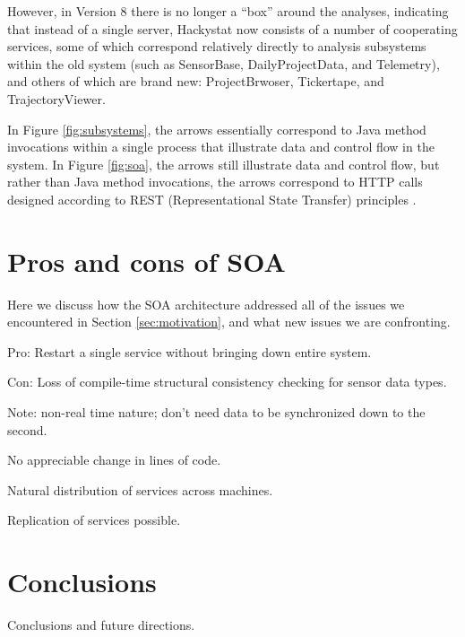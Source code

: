 \documentclass[conference,compsoc,peerreview]{IEEEtran}
\begin{document}
However, in Version 8 there is no longer a ``box'' around the analyses,
indicating that instead of a single server, Hackystat now consists of a
number of cooperating services, some of which correspond relatively
directly to analysis subsystems within the old system (such as SensorBase,
DailyProjectData, and Telemetry), and others of which are brand new:
ProjectBrwoser, Tickertape, and TrajectoryViewer.

In Figure \ref{fig:subsystems}, the arrows essentially correspond to Java
method invocations within a single process that illustrate data and control
flow in the system.  In Figure \ref{fig:soa}, the arrows still illustrate
data and control flow, but rather than Java method invocations, the arrows
correspond to HTTP calls designed according to REST (Representational State
Transfer) principles \cite{Fielding02}. 



\section{Pros and cons of SOA}
\label{sec:discussion}

Here we discuss how the SOA architecture addressed all of the issues we encountered in Section \ref{sec:motivation}, and what new issues we are confronting. 

Pro: Restart a single service without bringing down entire system.

Con: Loss of compile-time structural consistency checking for sensor data types.

Note: non-real time nature; don't need data to be synchronized down to the second. 

No appreciable change in lines of code. 

Natural distribution of services across machines. 

Replication of services possible.

\section{Conclusions}
\label{sec:conclusion}

Conclusions and future directions. 




\end{document}
